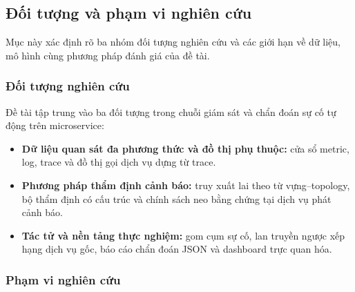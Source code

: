 \subsection{Đối tượng và phạm vi nghiên cứu}
\label{subsec:scope}

Mục này xác định rõ ba nhóm đối tượng nghiên cứu và các giới hạn về dữ liệu, mô hình cùng phương pháp đánh giá của đề tài.

\subsubsection{Đối tượng nghiên cứu}
\label{subsubsec:research_objects}

Đề tài tập trung vào ba đối tượng trong chuỗi giám sát và chẩn đoán sự cố tự động trên microservice:
\begin{itemize}[label=--]
    \item \textbf{Dữ liệu quan sát đa phương thức và đồ thị phụ thuộc:} cửa sổ metric, log, trace và đồ thị gọi dịch vụ dựng từ trace.
    \item \textbf{Phương pháp thẩm định cảnh báo:} truy xuất lai theo từ vựng--topology, bộ thẩm định  có cấu trúc và chính sách neo bằng chứng tại dịch vụ phát cảnh báo.
    \item \textbf{Tác tử  và nền tảng thực nghiệm:} gom cụm sự cố, lan truyền ngược xếp hạng dịch vụ gốc, báo cáo chẩn đoán JSON và dashboard trực quan hóa.
\end{itemize}

\subsubsection{Phạm vi nghiên cứu}
\label{subsubsec:research_scope}

